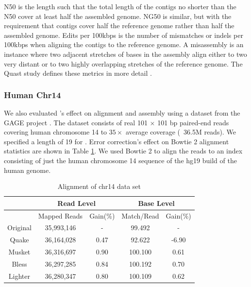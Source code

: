\documentclass[10pt]{article}
\begin{document}
N50 is the length such that the total length of the contigs no shorter than the N50 cover at least half the assembled genome.  NG50 is similar, but with the requirement that contigs cover half the reference genome rather than half the assembled genome. Edits per 100kbps is the number of mismatches or indels per 100kbps when aligning the contigs to the reference genome. A misassembly is an instance where two adjacent stretches of bases in the assembly align either to two very distant or to two highly overlapping stretches of the reference genome.  The Quast study defines these metrics in more detail \cite{gurevich2013quast}.


\subsubsection*{Human Chr14}
We also evaluated \tool's effect on alignment and assembly using a dataset from the GAGE project \cite{salzberg2012gage}.  The dataset consists of real 101 $\times$ 101 bp paired-end reads covering human chromosome 14 to $35\times$ average coverage (~36.5M reads).  We specified a \kmer length of 19 for \tool.
Error correction's effect on Bowtie 2 alignment statistics are shown in Table \ref{table:chr14_alignment}.  We used Bowtie 2 to align the reads to an index consisting of just the human chromosome 14 sequence of the hg19 build of the human genome.

\begin{table}
\centering
\begin{tabular}{|c|c|c||c|c|}\hline
  & \multicolumn{2}{|c||}{Read Level} & \multicolumn{2}{|c|}{Base Level} \\ \hline
  & Mapped Reads  &Gain(\%) &	Match/Read	& Gain(\%) \\ \hline
Original & 35,993,146	&- 		&	99.492	& - \\ \hline
Quake 	& 36,164,028	& 0.47 &	92.622	& -6.90 \\ \hline
Musket 	&	36,316,697	& 0.90	& 100.100	& 0.61 \\ \hline
Bless 	&36,297,285	& 0.84	& 100.192	&	0.70 \\ \hline
Lighter	&36,280,347	& 0.80	& 100.109	& 0.62 \\ \hline
\end{tabular}
\caption{Alignment of chr14 data set\label{table:chr14_alignment}}
\end{table}
\end{document}

